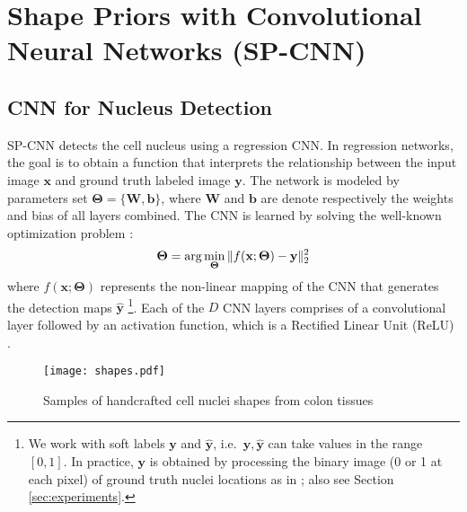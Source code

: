 \documentclass{article}
\begin{document}
\section{Shape Priors with Convolutional Neural Networks (SP-CNN)}\vspace{-3pt}

\subsection{CNN for Nucleus Detection}\vspace{-3pt}
SP-CNN detects the cell nucleus using a regression CNN. In regression networks, the goal is to obtain a function that interprets the relationship between the input image $\mathbf{x}$ and ground truth labeled image $\mathbf{y}$. The network is modeled by parameters set $\mathbf{\Theta}=\{\mathbf{W}, \mathbf{b}\}$, where $\mathbf{W}$ and $\mathbf{b}$ are denote respectively the weights and bias of all layers combined. The CNN is learned by solving the well-known optimization problem \cite{SC_CNN,RegFuncRef1,RegFuncRef2}:\vspace{-2mm}
\begin{equation}
\mathbf{\Theta} = \arg\min\limits_{\mathbf{\Theta}}\|f(\mathbf{x}; \mathbf{\Theta}) - \mathbf{y}\|_2^2
\label{eq:CNN_func}\vspace{-2mm}
\end{equation}
where $f(\mathbf{x;\Theta})$ represents the non-linear mapping of the CNN that generates the detection maps $\mathbf{\hat{y}}$ \footnote{\noindent We work with soft labels $\mathbf{y}$ and $\mathbf{\hat{y}}$, i.e.\ $\mathbf{y}, \mathbf{\hat{y}}$ can take values in the range $[0,1]$. In practice, $\mathbf{y}$ is obtained by processing the binary image (0 or 1 at each pixel) of ground truth nuclei locations as in \cite{SC_CNN}; also see Section \ref{sec:experiments}.}. Each of the $D$ CNN layers comprises of a convolutional layer followed by an activation function, which is a Rectified Linear Unit (ReLU) \cite{relu}.

\begin{figure}
	\begin{center}
	\vspace{-4pt}
		\texttt{[image: shapes.pdf]}\vspace{-5pt}
		\caption{\ninept Samples of handcrafted cell nuclei shapes from colon tissues}
		\label{fig:shapes}
	\end{center}\vspace{-25pt}
\end{figure}
\end{document}
